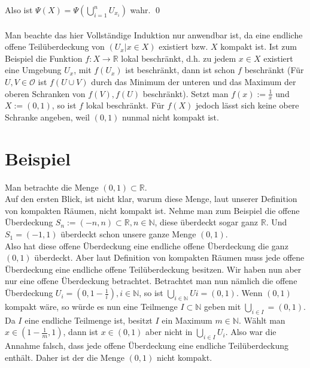	Also ist \(\Psi(X) =  \Psi(\bigcup_{i=1}^{n} U_{x_i})\) wahr.
\qed
\\
\\
Man beachte das hier Vollständige Induktion nur anwendbar ist, da eine endliche offene Teilüberdeckung von \( (U_x | x \in X) \) existiert bzw. \(X\) kompakt ist.
Ist zum Beispiel die Funktion \(f : X \to \mathbb{R}\) lokal beschränkt, d.h. zu jedem \(x \in X\) existiert eine Umgebung \(U_x\), mit \(f(U_x)\) ist beschränkt, 
dann ist schon \(f\) beschränkt (Für \(U,V \in \mathcal{O}\) ist \(f(U \cup V)\) durch das Minimum der unteren und das Maximum der oberen 
Schranken von \(f(V), f(U)\) beschränkt). Setzt man \(f(x):=\frac{1}{x}\) und \(X:=(0,1)\), so ist \(f\) lokal beschränkt.
Für \(f(X)\) jedoch lässt sich keine obere Schranke angeben, weil \((0,1)\) nunmal nicht kompakt ist.


\section{Beispiel}
Man betrachte die Menge \( (0,1) \subset \mathbb{R} \).\\ Auf den ersten Blick, ist nicht klar, warum diese Menge, laut unserer Definition von kompakten Räumen, nicht kompakt ist. 
Nehme man zum Beispiel die offene Überdeckung \( S_{n} := (-n,n) \subset \mathbb{R} , n \in \mathbb{N} \), diese überdeckt sogar ganz \(  \mathbb{R} \). 
Und \( S_{1} = (-1,1)  \) überdeckt schon unsere ganze Menge \( (0,1) \). \\
Also hat diese offene Überdeckung eine endliche offene Überdeckung die ganz \( (0,1)\) überdeckt.
Aber laut Definition von kompakten Räumen muss jede offene Überdeckung eine endliche offene Teilüberdeckung besitzen. Wir haben nun aber nur eine offene Überdeckung betrachtet. Betrachtet man nun nämlich die offene Überdeckung \( U_{i}=(0,1-\frac{1}{i}), i \in \mathbb{N} \), so ist \(\bigcup_{i \in \mathbb{N}} U{i} = (0,1) \). Wenn \( (0,1)  \) kompakt wäre, 
so würde es nun eine Teilmenge \(I \subset \mathbb{N} \) geben mit \(\bigcup_{i \in I} = (0,1) \).
Da \(I\) eine endliche Teilmenge ist, besitzt \(I\) ein Maximum \( m \in \mathbb{N} \). Wählt man \(x \in (1-\frac{1}{m},1) \), dann ist \(x \in (0,1) \) aber nicht in 
\(\bigcup_{i \in I} U_{i}\). Also war die Annahme falsch, dass jede offene Überdeckung eine endliche Teilüberdeckung enthält. Daher ist der die Menge \((0,1) \) nicht kompakt.
		
